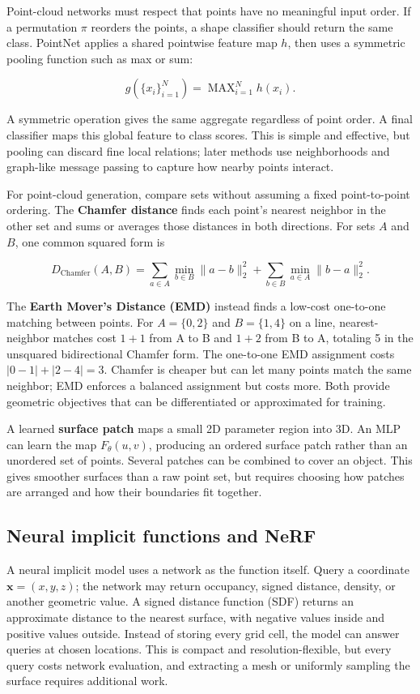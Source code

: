 Point-cloud networks must respect that points have no meaningful input order. If a permutation \(\pi\) reorders the points, a shape classifier should return the same class. PointNet applies a shared pointwise feature map \(h\), then uses a symmetric pooling function such as max or sum:

\[
g(\{x_i\}_{i=1}^{N})=\operatorname{MAX}_{i=1}^{N}h(x_i).
\]

A symmetric operation gives the same aggregate regardless of point order. A final classifier maps this global feature to class scores. This is simple and effective, but pooling can discard fine local relations; later methods use neighborhoods and graph-like message passing to capture how nearby points interact.

For point-cloud generation, compare sets without assuming a fixed point-to-point ordering. The \textbf{Chamfer distance} finds each point's nearest neighbor in the other set and sums or averages those distances in both directions. For sets \(A\) and \(B\), one common squared form is

\[
D_{\text{Chamfer}}(A,B)=\sum_{a\in A}\min_{b\in B}\|a-b\|_2^2+
\sum_{b\in B}\min_{a\in A}\|b-a\|_2^2.
\]

The \textbf{Earth Mover's Distance (EMD)} instead finds a low-cost one-to-one matching between points. For \(A=\{0,2\}\) and \(B=\{1,4\}\) on a line, nearest-neighbor matches cost \(1+1\) from A to B and \(1+2\) from B to A, totaling 5 in the unsquared bidirectional Chamfer form. The one-to-one EMD assignment costs \(|0-1|+|2-4|=3\). Chamfer is cheaper but can let many points match the same neighbor; EMD enforces a balanced assignment but costs more. Both provide geometric objectives that can be differentiated or approximated for training.

A learned \textbf{surface patch} maps a small 2D parameter region into 3D. An MLP can learn the map \(F_\theta(u,v)\), producing an ordered surface patch rather than an unordered set of points. Several patches can be combined to cover an object. This gives smoother surfaces than a raw point set, but requires choosing how patches are arranged and how their boundaries fit together.

\subsection{Neural implicit functions and NeRF}\label{04-visual-computing-ii-ch034-neural-implicit-functions-and-nerf}

A neural implicit model uses a network as the function itself. Query a coordinate \(\mathbf{x}=(x,y,z)\); the network may return occupancy, signed distance, density, or another geometric value. A signed distance function (SDF) returns an approximate distance to the nearest surface, with negative values inside and positive values outside. Instead of storing every grid cell, the model can answer queries at chosen locations. This is compact and resolution-flexible, but every query costs network evaluation, and extracting a mesh or uniformly sampling the surface requires additional work.

